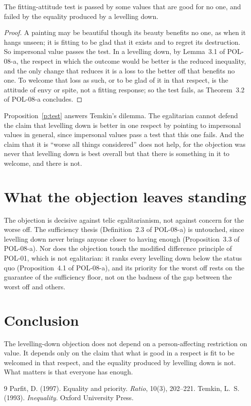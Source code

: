 \documentclass{situationist-preprint}
\begin{document}
\begin{proposition}\label{p:test}
The fitting-attitude test is passed by some values that are good for no one, and failed by the equality produced by a levelling down.
\end{proposition}

\begin{proof}
A painting may be beautiful though its beauty benefits no one, as when it hangs unseen; it is fitting to be glad that it exists and to regret its destruction. So impersonal value passes the test. In a levelling down, by Lemma~3.1 of POL-08-a, the respect in which the outcome would be better is the reduced inequality, and the only change that reduces it is a loss to the better off that benefits no one. To welcome that loss as such, or to be glad of it in that respect, is the attitude of envy or spite, not a fitting response; so the test fails, as Theorem~3.2 of POL-08-a concludes.
\end{proof}

Proposition~\ref{p:test} answers Temkin's dilemma. The egalitarian cannot defend the claim that levelling down is better in one respect by pointing to impersonal values in general, since impersonal values pass a test that this one fails. And the claim that it is \enquote{worse all things considered} does not help, for the objection was never that levelling down is best overall but that there is something in it to welcome, and there is not.

\section{What the objection leaves standing}

The objection is decisive against telic egalitarianism, not against concern for the worse off. The sufficiency thesis (Definition~2.3 of POL-08-a) is untouched, since levelling down never brings anyone closer to having enough (Proposition~3.3 of POL-08-a). Nor does the objection touch the modified difference principle of POL-01, which is not egalitarian: it ranks every levelling down below the status quo (Proposition~4.1 of POL-08-a), and its priority for the worst off rests on the guarantee of the sufficiency floor, not on the badness of the gap between the worst off and others.

\section{Conclusion}

The levelling-down objection does not depend on a person-affecting restriction on value. It depends only on the claim that what is good in a respect is fit to be welcomed in that respect, and the equality produced by levelling down is not. What matters is that everyone has enough.

\begin{thebibliography}{9}
 Parfit, D. (1997). Equality and priority. \emph{Ratio}, 10(3), 202--221.
 Temkin, L.~S. (1993). \emph{Inequality}. Oxford University Press.
\end{thebibliography}
\end{document}
